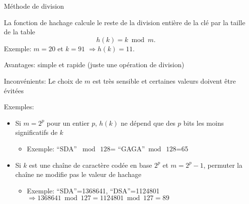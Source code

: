 \begin{frame}{Méthode de division}

La fonction de hachage calcule le reste de la division entière de la clé par la taille de la table
$$h(k)=k\bmod m.$$
Exemple: $m=20$ et $k=91$ $\Rightarrow h(k)=11$.

\bigskip

\alert{Avantages:} simple et rapide (juste une opération de division)

\bigskip

\alert{Inconvénients:} Le choix de $m$ est très sensible et certaines valeurs doivent être évitées

\bigskip

Exemples:
\begin{itemize}
\item Si $m=2^p$ pour un entier $p$, $h(k)$ ne dépend que des $p$ bits
  les moins significatifs de $k$\\
\begin{itemize}
\item Exemple: ``SDA'' $\bmod\ 128$= ``GAGA''$\bmod\ 128$=65
\end{itemize}
\item Si $k$ est une chaîne de caractère codée en base $2^p$ et $m=2^p-1$, permuter la chaîne ne modifie pas le valeur de hachage\\
\begin{itemize}
\item Exemple: ``SDA''=1368641, ``DSA''=1124801\\
$\Rightarrow 1368641\bmod 127=1124801\bmod 127=89$
\end{itemize}
\end{itemize}
\end{frame}

